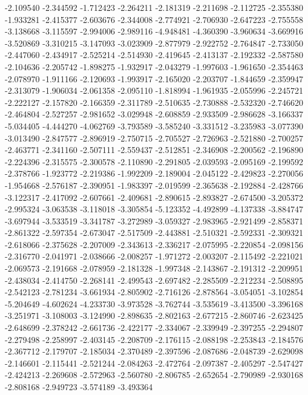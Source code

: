 -2.109540
-2.344592
-1.712423
-2.264211
-2.181319
-2.211698
-2.112725
-2.355380
-1.933281
-2.415377
-2.603676
-2.344008
-2.774921
-2.706930
-2.647223
-2.755558
-3.138668
-3.115597
-2.994006
-2.989116
-4.948481
-4.360390
-3.960634
-3.669916
-3.520869
-3.310215
-3.147093
-3.023909
-2.877979
-2.922752
-2.764847
-2.733050
-2.447060
-2.434917
-2.525214
-2.514930
-2.419645
-2.413137
-2.192332
-2.587580
-2.104636
-2.205742
-1.898275
-1.932917
-2.043279
-1.997603
-1.961650
-2.354463
-2.078970
-1.911166
-2.120693
-1.993917
-2.165020
-2.203707
-1.844659
-2.359947
-2.313079
-1.906034
-2.061358
-2.095110
-1.818994
-1.961935
-2.055996
-2.245721
-2.222127
-2.157820
-2.166359
-2.311789
-2.510635
-2.730888
-2.532320
-2.746620
-2.464804
-2.527257
-2.981652
-3.029948
-2.608859
-2.933509
-2.986628
-3.166337
-5.034405
-4.444270
-4.062769
-3.793589
-3.585240
-3.331512
-3.235983
-3.077390
-3.013490
-2.847577
-2.896919
-2.750715
-2.705527
-2.726963
-2.521880
-2.700257
-2.463771
-2.341160
-2.507111
-2.559437
-2.512851
-2.346908
-2.200562
-2.196890
-2.224396
-2.315575
-2.300578
-2.110890
-2.291805
-2.039593
-2.095169
-2.199592
-2.378766
-1.923772
-2.219386
-1.992209
-2.189004
-2.045122
-2.429823
-2.270056
-1.954668
-2.576187
-2.390951
-1.983397
-2.019599
-2.365638
-2.192884
-2.428766
-3.122317
-2.417092
-2.607661
-2.409681
-2.890615
-2.893827
-2.674500
-3.205372
-2.995324
-3.063538
-3.118018
-3.305854
-5.123352
-4.492899
-4.137338
-3.884747
-3.697944
-3.533519
-3.341787
-3.272989
-3.059327
-2.983965
-2.921499
-2.858371
-2.861322
-2.597354
-2.673047
-2.517509
-2.443881
-2.510321
-2.592331
-2.309321
-2.618066
-2.375628
-2.207009
-2.343613
-2.336217
-2.075995
-2.220854
-2.098156
-2.316770
-2.041971
-2.038666
-2.008257
-1.971272
-2.003207
-2.115492
-2.221021
-2.069573
-2.191668
-2.078959
-2.181328
-1.997348
-2.143867
-2.191312
-2.209951
-2.438034
-2.414750
-2.268141
-2.499543
-2.697482
-2.285509
-2.212234
-2.508895
-2.542123
-2.781234
-3.661934
-2.805902
-2.716126
-2.878564
-3.054051
-3.102854
-5.204649
-4.602624
-4.233730
-3.973528
-3.762744
-3.535619
-3.413500
-3.396168
-3.251971
-3.108003
-3.124990
-2.898635
-2.802163
-2.677215
-2.860746
-2.623425
-2.648699
-2.378242
-2.661736
-2.422177
-2.334067
-2.339949
-2.397255
-2.294807
-2.279498
-2.258997
-2.403145
-2.208709
-2.176115
-2.088198
-2.253843
-2.184576
-2.367712
-2.179707
-2.185034
-2.370489
-2.397596
-2.087686
-2.048739
-2.629098
-2.146601
-2.115441
-2.521244
-2.084263
-2.472764
-2.097387
-2.405297
-2.547427
-2.424213
-2.269608
-2.572963
-2.560780
-2.806785
-2.652654
-2.790989
-2.930168
-2.808168
-2.949723
-3.574189
-3.493364
